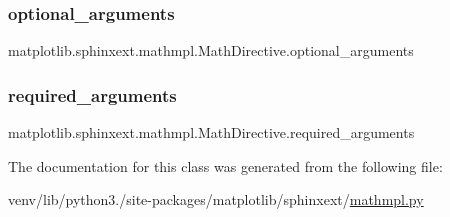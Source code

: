 \subsubsection{\texorpdfstring{optional\+\_\+arguments}{optional\_arguments}}
{\footnotesize\ttfamily matplotlib.\+sphinxext.\+mathmpl.\+Math\+Directive.\+optional\+\_\+arguments\hspace{0.3cm}{\ttfamily [static]}}

\mbox{\label{classmatplotlib_1_1sphinxext_1_1mathmpl_1_1MathDirective_a6542d939e0b01a993c0dadb03e8fa38a}} 
\subsubsection{\texorpdfstring{required\+\_\+arguments}{required\_arguments}}
{\footnotesize\ttfamily matplotlib.\+sphinxext.\+mathmpl.\+Math\+Directive.\+required\+\_\+arguments\hspace{0.3cm}{\ttfamily [static]}}



The documentation for this class was generated from the following file\+:\begin{DoxyCompactItemize}
\item 
venv/lib/python3./site-\/packages/matplotlib/sphinxext/\hyperlink{mathmpl_8py}{mathmpl.\+py}\end{DoxyCompactItemize}
